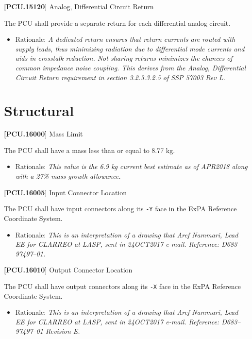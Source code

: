 \documentclass[12pt,oneside,oldfontcommands]{memoir}
\begin{document}
\textbf{[PCU.15120]} Analog, Differential Circuit Return

The \gls{PCU} shall provide a separate return for each differential analog circuit.

\begin{itemize}
\item{} Rationale: \emph{A dedicated return ensures that return currents are routed with supply leads, thus minimizing radiation due to differential mode currents and aids in crosstalk reduction. Not sharing returns minimizes the chances of common impedance noise coupling. This derives from the Analog, Differential Circuit Return requirement in section 3.2.3.3.2.5 of SSP 57003 Rev L.}

\end{itemize}

\section{Structural}
\label{structural}

\textbf{[PCU.16000]} Mass Limit

The \gls{PCU} shall have a mass less than or equal to 8.77 kg.

\begin{itemize}
\item{} Rationale: \emph{This value is the 6.9 kg current best estimate as of APR2018 along with a 27\% mass growth allowance.}

\end{itemize}

\textbf{[PCU.16005]} Input Connector Location

The \gls{PCU} shall have input connectors along its \texttt{-Y} face in the \gls{ExPA} Reference Coordinate System.

\begin{itemize}
\item{} Rationale: \emph{This is an interpretation of a drawing that Aref Nammari, Lead EE for CLARREO at LASP, sent in 24OCT2017 e-mail. Reference: D683--97497--01.}

\end{itemize}

\textbf{[PCU.16010]} Output Connector Location

The \gls{PCU} shall have output connectors along its \texttt{-X} face in the \gls{ExPA} Reference Coordinate System.

\begin{itemize}
\item{} Rationale: \emph{This is an interpretation of a drawing that Aref Nammari, Lead EE for CLARREO at LASP, sent in 24OCT2017 e-mail. Reference: D683--97497--01 Revision E.}

\end{itemize}
\end{document}
